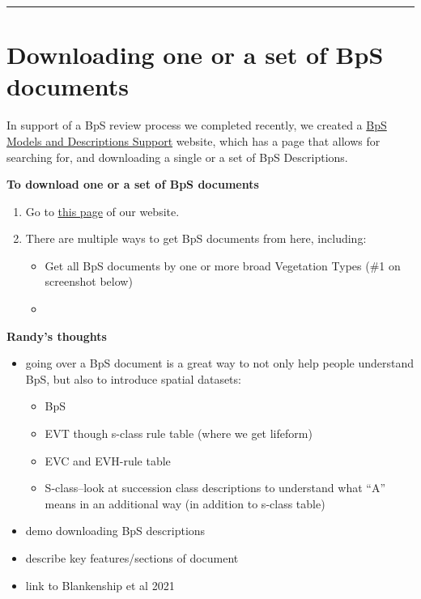 \documentclass[
  letterpaper,
  DIV=11,
  numbers=noendperiod]{scrreprt}
\providecommand{\tightlist}{%
  \setlength{\itemsep}{0pt}\setlength{\parskip}{0pt}}\usepackage{longtable,booktabs,array}
\begin{document}
\begin{center}\rule{0.5\linewidth}{0.5pt}\end{center}

\hypertarget{downloading-one-or-a-set-of-bps-documents}{%
\section{Downloading one or a set of BpS
documents}\label{downloading-one-or-a-set-of-bps-documents}}

In support of a BpS review process we completed recently, we created a
\href{https://landfirereview.org/}{BpS Models and Descriptions Support}
website, which has a page that allows for searching for, and downloading
a single or a set of BpS Descriptions.

\textbf{To download one or a set of BpS documents}

\begin{enumerate}
\def\labelenumi{\arabic{enumi}.}
\tightlist
\item
  Go to \href{https://landfirereview.org/search.php}{this page} of our
  website.
\item
  There are multiple ways to get BpS documents from here, including:

  \begin{itemize}
  \tightlist
  \item
    Get all BpS documents by one or more broad Vegetation Types (\#1 on
    screenshot below)
  \item
  \end{itemize}
\end{enumerate}

\textbf{Randy's thoughts}

\begin{itemize}
\tightlist
\item
  going over a BpS document is a great way to not only help people
  understand BpS, but also to introduce spatial datasets:

  \begin{itemize}
  \tightlist
  \item
    BpS
  \item
    EVT though s-class rule table (where we get lifeform)
  \item
    EVC and EVH-rule table
  \item
    S-class--look at succession class descriptions to understand what
    ``A'' means in an additional way (in addition to s-class table)
  \end{itemize}
\item
  demo downloading BpS descriptions
\item
  describe key features/sections of document
\item
  link to Blankenship et al 2021
\end{itemize}
\end{document}

